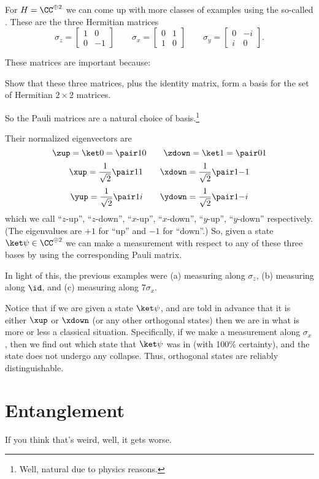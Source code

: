For $H = \CC^{\oplus 2}$ we can come up with more classes of examples using
the so-called .
These are the three Hermitian matrices
\[
	\sigma_z = \begin{bmatrix} 1 & 0 \\ 0 & -1 \end{bmatrix}
	\qquad
	\sigma_x = \begin{bmatrix} 0 & 1 \\ 1 & 0 \end{bmatrix}
	\qquad
	\sigma_y = \begin{bmatrix} 0 & -i \\ i & 0 \end{bmatrix}.
\]

These matrices are important because:
\begin{ques}
	Show that these three matrices, plus the identity matrix,
	form a basis for the set of Hermitian $2 \times 2$ matrices.
\end{ques}
So the Pauli matrices are a natural choice of basis.\footnote{Well,
	natural due to physics reasons.
}

Their normalized eigenvectors are
\[ \zup = \ket0 = \pair10 \qquad \zdown = \ket1 = \pair01 \]
\[ \xup = \frac{1}{\sqrt2}\pair11
	\qquad \xdown = \frac{1}{\sqrt2}\pair1{-1} \]
\[ \yup = \frac{1}{\sqrt2}\pair1i
	\qquad \ydown = \frac{1}{\sqrt2}\pair1{-i} \]
which we call ``$z$-up'', ``$z$-down'',
``$x$-up'', ``$x$-down'', ``$y$-up'', ``$y$-down'' respectively.
(The eigenvalues are $+1$ for ``up'' and $-1$ for ``down''.)
So, given a state $\ket\psi \in \CC^{\oplus 2}$
we can make a measurement with respect to any of these three bases
by using the corresponding Pauli matrix.

In light of this, the previous examples were
(a) measuring along $\sigma_z$,
(b) measuring along $\id$,
and (c) measuring along $7\sigma_x$.

Notice that if we are given a state $\ket\psi$,
and are told in advance that it is either $\xup$ or $\xdown$
(or any other orthogonal states)
then we are in what is more or less a classical situation.
Specifically, if we make a measurement along $\sigma_x$,
then we find out which state that $\ket\psi$ was in (with 100\% certainty),
and the state does not undergo any collapse.
Thus, orthogonal states are reliably distinguishable.

\section{Entanglement}
If you think that's weird, well, it gets worse.

